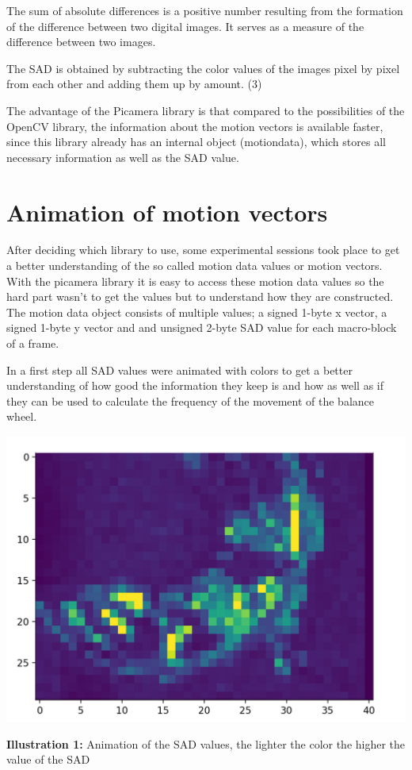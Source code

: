 \documentclass[12pt, a4paper]{report}
\begin{document}
The sum of absolute differences is a positive number resulting from the formation of the difference between two digital images. It serves as a measure of the difference between two images.

The SAD is obtained by subtracting the color values of the images pixel by pixel from each other and adding them up by amount. (3)

The advantage of the Picamera library is that compared to the possibilities of the OpenCV library, the information about the motion vectors is available faster, since this library already has an internal object (motiondata), which stores all necessary information as well as the SAD value. 

\section{Animation of motion vectors}
After deciding which library to use, some experimental sessions took place to get a better understanding of the so called motion data values or motion vectors. 
With the picamera library it is easy to access these motion data values so the hard part wasn't to get the values but to understand how they are constructed. 
The motion data object consists of multiple values; a signed 1-byte x vector, a signed 1-byte y vector and and unsigned 2-byte SAD value for each macro-block of a frame.

In a first step all SAD values were animated with colors to get a better understanding of how good the information they keep is and how as well as if they can be used to calculate the frequency of the movement of the balance wheel.

\bigskip

\noindent
\begin{center}
\includegraphics[scale=0.6]{Images/animation_sad.png}

{\bf Illustration 1:}  Animation of the SAD values, the lighter the color the higher the value of the SAD
\end{center}
\end{document}
